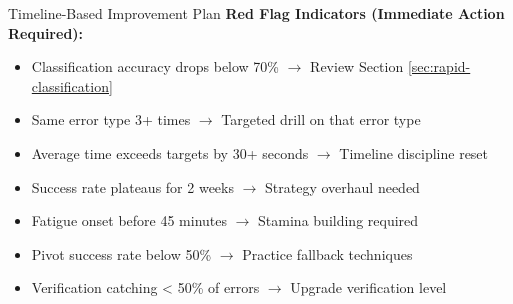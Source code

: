 \documentclass{article}
\begin{document}
\begin{analysisbox}{Timeline-Based Improvement Plan}
\textbf{Red Flag Indicators (Immediate Action Required):}
\begin{itemize}[nosep]
\item[$\square$] Classification accuracy drops below 70\% $\rightarrow$ Review Section \ref{sec:rapid-classification}
\item[$\square$] Same error type 3+ times $\rightarrow$ Targeted drill on that error type
\item[$\square$] Average time exceeds targets by 30+ seconds $\rightarrow$ Timeline discipline reset
\item[$\square$] Success rate plateaus for 2 weeks $\rightarrow$ Strategy overhaul needed
\item[$\square$] Fatigue onset before 45 minutes $\rightarrow$ Stamina building required
\item[$\square$] Pivot success rate below 50\% $\rightarrow$ Practice fallback techniques
\item[$\square$] Verification catching < 50\% of errors $\rightarrow$ Upgrade verification level
\end{itemize}
\end{analysisbox}
\end{document}
